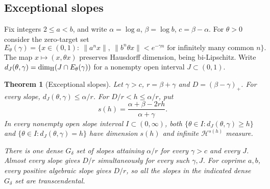\documentclass[11pt,reqno,a4paper]{amsart}
\newtheorem{theorem}{Theorem}[section]
\theoremstyle{remark}
\numberwithin{equation}{section}
\begin{document}
\clearpage
\subsection{Exceptional slopes}\label{sec:exceptional-slopes}
Fix integers \(2\le a<b\), and write \(\alpha=\log a\), \(\beta=\log b\),
\(c=\beta-\alpha\). For \(\theta>0\) consider the zero-target set
\[
 E_\theta(\gamma)=\{x\in(0,1):\ \|a^n x\|,\ \|b^n\theta x\|<e^{-\gamma n}
                      \text{ for infinitely many common }n\}.
\]
The map \(x\mapsto(x,\theta x)\) preserves Hausdorff dimension, being
bi-Lipschitz. Write \(d_J(\theta,\gamma)=\dim_{\rm H}(J\cap E_\theta(\gamma))\)
for a nonempty open interval \(J\subset(0,1)\).

\begin{theorem}[Exceptional slopes]\label{thm:exceptional-slopes}
Let \(\gamma>c\), \(r=\beta+\gamma\) and \(D=(\beta-\gamma)_+\).
For every slope, \(d_J(\theta,\gamma)\le\alpha/r\).
For \(D/r<h\le\alpha/r\), put
\begin{equation}\label{eq:theta-spectrum}
                 s(h)=\frac{\alpha+\beta-2rh}{\alpha+\gamma}.
\end{equation}
In every nonempty open slope interval \(I\subset(0,\infty)\), both
\(\{\theta\in I:d_J(\theta,\gamma)\ge h\}\) and
\(\{\theta\in I:d_J(\theta,\gamma)=h\}\) have dimension \(s(h)\)
and infinite \(\mathcal H^{s(h)}\) measure.

There is one dense \(G_\delta\) set of slopes attaining \(\alpha/r\)
for every \(\gamma>c\) and every \(J\). Almost every slope gives \(D/r\)
simultaneously for every such \(\gamma,J\). For coprime \(a,b\),
every positive algebraic slope gives \(D/r\), so all the slopes in
the indicated dense \(G_\delta\) set are transcendental.
\end{theorem}
\end{document}
